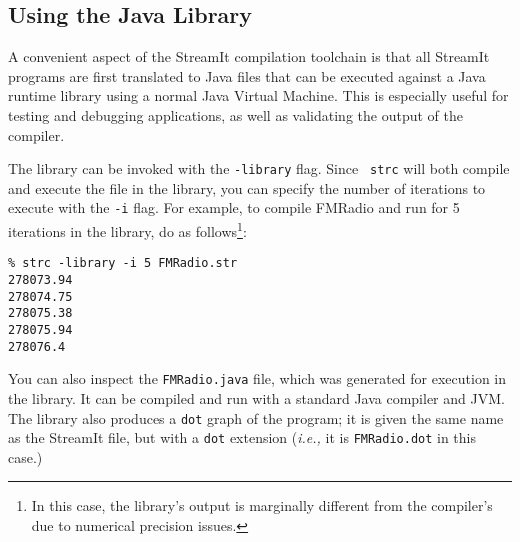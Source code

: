 \subsection{Using the Java Library}

A convenient aspect of the StreamIt compilation toolchain is that all
StreamIt programs are first translated to Java files that can be
executed against a Java runtime library using a normal Java Virtual
Machine.  This is especially useful for testing and debugging
applications, as well as validating the output of the compiler.

The library can be invoked with the {\tt -library} flag.  Since {\tt
strc} will both compile and execute the file in the library, you can
specify the number of iterations to execute with the {\tt -i} flag.
For example, to compile FMRadio and run for 5 iterations in the
library, do as follows\footnote{In this case, the library's output is
marginally different from the compiler's due to numerical precision
issues.}:
%
{\small
\begin{verbatim}
% strc -library -i 5 FMRadio.str
278073.94
278074.75
278075.38
278075.94
278076.4
\end{verbatim}
} 
%
You can also inspect the {\tt FMRadio.java} file, which was generated
for execution in the library.  It can be compiled and run with a
standard Java compiler and JVM.  The library also produces a {\tt dot}
graph of the program; it is given the same name as the StreamIt file,
but with a {\tt dot} extension ({\it i.e.,} it is {\tt FMRadio.dot} in
this case.)

